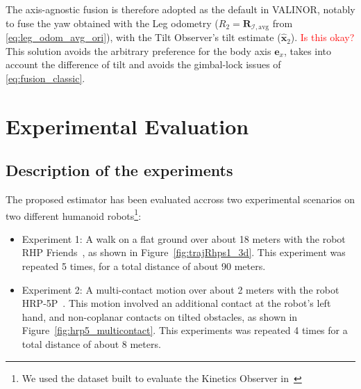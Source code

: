 \documentclass{IJCAS}
\begin{document}
The axis-agnostic fusion is therefore adopted as the default in \textsc{VALINOR}, notably to fuse the yaw obtained with the Leg odometry ($R_{2} = \boldsymbol{R}_{\mathcal{I}, \text{avg}}$ from \eqref{eq:leg_odom_avg_ori}), with the Tilt Observer's tilt estimate ($\hat{\boldsymbol{x}}_{2}$). \textcolor{red}{Is this okay?} This solution avoids the arbitrary preference for the body axis \(\boldsymbol{e}_{x}\), takes into account the difference of tilt and avoids the gimbal-lock issues of \eqref{eq:fusion_classic}. 





\section{Experimental Evaluation}
\subsection{Description of the experiments}

The proposed estimator has been evaluated accross two experimental scenarios on two different humanoid robots\footnote{We used the dataset built to evaluate the Kinetics Observer in~\cite{Demont2024KineticsObserver}}:
\begin{itemize}
    \item Experiment 1: A walk on a flat ground over about 18 meters with the robot RHP Friends~\cite{Benallegue2025RhpFriendsJRL}, as shown in Figure~\ref{fig:trajRhps1_3d}. This experiment was repeated 5 times, for a total distance of about 90 meters.
    \item Experiment 2: A multi-contact motion over about 2 meters with the robot HRP-5P~\cite{Kaneko2019Hrp5}. This motion involved an additional contact at the robot's left hand, and non-coplanar contacts on tilted obstacles, as shown in Figure~\ref{fig:hrp5_multicontact}. This experiments was repeated 4 times for a total distance of about 8 meters.
\end{itemize}
\end{document}
